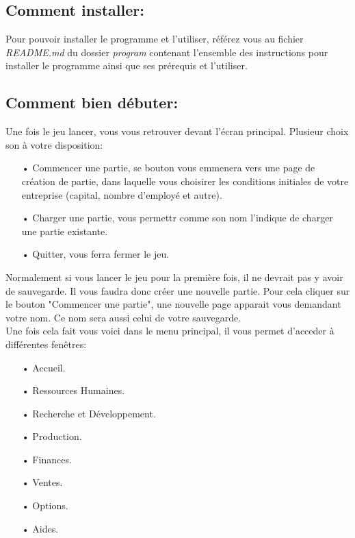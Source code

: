 \subsection{Comment installer:}

Pour pouvoir installer le programme et l'utiliser, référez vous au fichier \textit{README.md} du dossier \textit{program} contenant l'ensemble des instructions pour installer le programme ainsi que ses prérequis et l'utiliser.

\subsection{Comment bien débuter:}



Une fois le jeu lancer, vous vous retrouver devant l'écran principal. Plusieur choix son à votre disposition:



\begin{enumerate}
	\item[•] Commencer une partie, se bouton vous emmenera vers une page de création de partie, dans laquelle vous choisirer les conditions initiales de votre entreprise (capital, nombre d'employé et autre).
	\item[•] Charger une partie, vous permettr comme son nom l'indique de charger une partie existante.
	\item[•] Quitter, vous ferra fermer le jeu.
\end{enumerate}

Normalement si vous lancer le jeu pour la première fois, il ne devrait pas y avoir de sauvegarde. Il vous faudra donc créer une nouvelle partie.  Pour cela cliquer sur le bouton "Commencer une partie", une nouvelle page apparait vous demandant votre nom. Ce nom sera aussi celui de votre sauvegarde.\\

Une fois cela fait vous voici dans le menu principal, il vous permet d'acceder à différentes fenêtres:



\begin{enumerate}
    \item[•] Accueil.
    \item[•] Ressources Humaines.
    \item[•] Recherche et Développement.
    \item[•] Production.
    \item[•] Finances.
    \item[•] Ventes.
    \item[•] Options.
    \item[•] Aides. 
\end{enumerate}



